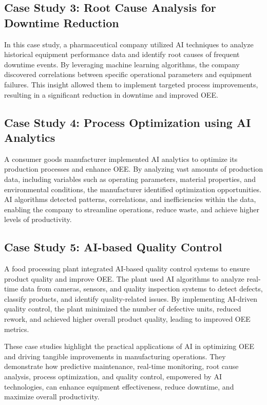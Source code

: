 \documentclass[12pt]{article}
\begin{document}
\subsection{Case Study 3: Root Cause Analysis for Downtime Reduction}
In this case study, a pharmaceutical company utilized AI techniques to analyze historical equipment performance data and identify root causes of frequent downtime events. By leveraging machine learning algorithms, the company discovered correlations between specific operational parameters and equipment failures. This insight allowed them to implement targeted process improvements, resulting in a significant reduction in downtime and improved OEE.

\subsection{Case Study 4: Process Optimization using AI Analytics}
A consumer goods manufacturer implemented AI analytics to optimize its production processes and enhance OEE. By analyzing vast amounts of production data, including variables such as operating parameters, material properties, and environmental conditions, the manufacturer identified optimization opportunities. AI algorithms detected patterns, correlations, and inefficiencies within the data, enabling the company to streamline operations, reduce waste, and achieve higher levels of productivity.

\subsection{Case Study 5: AI-based Quality Control}
A food processing plant integrated AI-based quality control systems to ensure product quality and improve OEE. The plant used AI algorithms to analyze real-time data from cameras, sensors, and quality inspection systems to detect defects, classify products, and identify quality-related issues. By implementing AI-driven quality control, the plant minimized the number of defective units, reduced rework, and achieved higher overall product quality, leading to improved OEE metrics.

These case studies highlight the practical applications of AI in optimizing OEE and driving tangible improvements in manufacturing operations. They demonstrate how predictive maintenance, real-time monitoring, root cause analysis, process optimization, and quality control, empowered by AI technologies, can enhance equipment effectiveness, reduce downtime, and maximize overall productivity.
\end{document}
